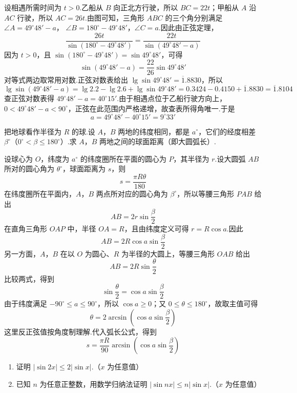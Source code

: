 \begin{solution}
设相遇所需时间为 \(t>0\).乙船从 \(B\) 向正北方行驶，所以 \(BC=22t\)；甲船从 \(A\) 沿 \(AC\) 行驶，所以 \(AC=26t\).由图可知，三角形 \(ABC\) 的三个角分别满足 \(\angle A=49^\circ48'-a\)，
\(\angle B=180^\circ-49^\circ48'\)，\(\angle C=a\).因此由正弦定理，
\[
\frac{26t}{\sin(180^\circ-49^\circ48')}=\frac{22t}{\sin(49^\circ48'-a)}
\]
因为 \(t>0\)，且 \(\sin(180^\circ-49^\circ48')=\sin49^\circ48'\)，可得
\[
\sin(49^\circ48'-a)=\frac{22}{26}\sin49^\circ48'
\]
对等式两边取常用对数.正弦对数表给出 \(\lg\sin49^\circ48'=\overline{1}.8830\)，所以
\[
\lg\sin(49^\circ48'-a)=\lg2.2-\lg2.6+\lg\sin49^\circ48'=0.3424-0.4150+\overline{1}.8830=\overline{1}.8104
\]
查正弦对数表得 \(49^\circ48'-a=40^\circ15'\).由于相遇点位于乙船行驶方向上，\(0<49^\circ48'-a<90^\circ\)，正弦在此范围内严格递增，故查表所得角唯一.于是
\[
a=49^\circ48'-40^\circ15'=9^\circ33'
\]
\end{solution}

\begin{problem}
把地球看作半径为 \(R\) 的球.设 \(A\)，\(B\) 两地的纬度相同，都是 \(a^\circ\)，它们的经度相差 \(\beta^\circ\)（\(0^\circ<\beta\leq180^\circ\)）.求 \(A\)，\(B\) 两地之间的球面距离（即大圆弧长）.

\end{problem}

\begin{solution}
设球心为 \(O\)，纬度为 \(a^\circ\) 的纬度圈所在平面的圆心为 \(P\)，其半径为 \(r\).设大圆弧 \(AB\) 所对的圆心角为 \(\theta^\circ\)，球面距离为 \(s\)，则
\[
s=\frac{\pi R\theta}{180}
\]
在纬度圈所在平面内，\(A\)，\(B\) 两点所对应的圆心角为 \(\beta^\circ\)，所以等腰三角形 \(PAB\) 给出
\[
AB=2r\sin\frac{\beta}{2}
\]
在直角三角形 \(OAP\) 中，半径 \(OA=R\)，且由纬度定义可得 \(r=R\cos a\).因此
\[
AB=2R\cos a\sin\frac{\beta}{2}
\]
另一方面，\(A\)，\(B\) 在以 \(O\) 为圆心、\(R\) 为半径的大圆上，等腰三角形 \(OAB\) 给出
\[
AB=2R\sin\frac{\theta}{2}
\]
比较两式，得到
\[
\sin\frac{\theta}{2}=\cos a\sin\frac{\beta}{2}
\]
由于纬度满足 \(-90^\circ\leq a\leq90^\circ\)，所以 \(\cos a\geq0\)；又 \(0\leq\theta\leq180^\circ\)，故取主值可得
\[
\theta=2\arcsin\left(\cos a\sin\frac{\beta}{2}\right)
\]
这里反正弦值按角度制理解.代入弧长公式，得到
\[
s=\frac{\pi R}{90}\arcsin\left(\cos a\sin\frac{\beta}{2}\right)
\]

\end{solution}

\begin{problem}
\begin{enumerate}
\item 证明 \( |\sin2x|\leq2|\sin x| \).（\(x\) 为任意值）
\item 已知 \(n\) 为任意正整数，用数学归纳法证明 \( |\sin nx|\leq n|\sin x| \).（\(x\) 为任意值）
\end{enumerate}
\end{problem}


